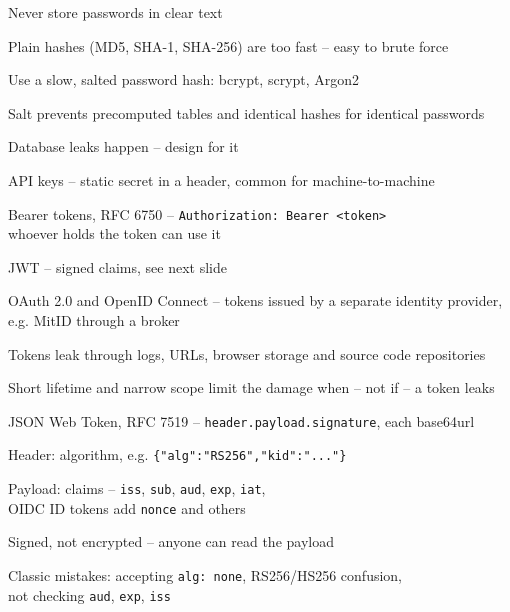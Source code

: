 \documentclass[Screen16to9,17pt]{foils}
\begin{document}


\begin{list2}
\item Never store passwords in clear text
\item Plain hashes (MD5, SHA-1, SHA-256) are too fast -- easy to brute force
\item Use a slow, salted password hash: bcrypt, scrypt, Argon2
\item Salt prevents precomputed tables and identical hashes for identical passwords
\item Database leaks happen -- design for it
\end{list2}



\begin{list2}
\item API keys -- static secret in a header, common for machine-to-machine
\item Bearer tokens, RFC 6750 -- \verb+Authorization: Bearer <token>+\\
  whoever holds the token can use it
\item JWT -- signed claims, see next slide
\item OAuth 2.0 and OpenID Connect -- tokens issued by a separate identity provider,\\
  e.g. MitID through a broker
\item Tokens leak through logs, URLs, browser storage and source code repositories
\item Short lifetime and narrow scope limit the damage when -- not if -- a token leaks
\end{list2}



\begin{list2}
\item JSON Web Token, RFC 7519 -- \verb+header.payload.signature+, each base64url
\item Header: algorithm, e.g. \verb+{"alg":"RS256","kid":"..."}+
\item Payload: claims -- \verb+iss+, \verb+sub+, \verb+aud+, \verb+exp+, \verb+iat+,\\
  OIDC ID tokens add \verb+nonce+ and others
\item Signed, not encrypted -- anyone can read the payload
\item Classic mistakes: accepting \verb+alg: none+, RS256/HS256 confusion,\\
  not checking \verb+aud+, \verb+exp+, \verb+iss+
\end{list2}
\end{document}
